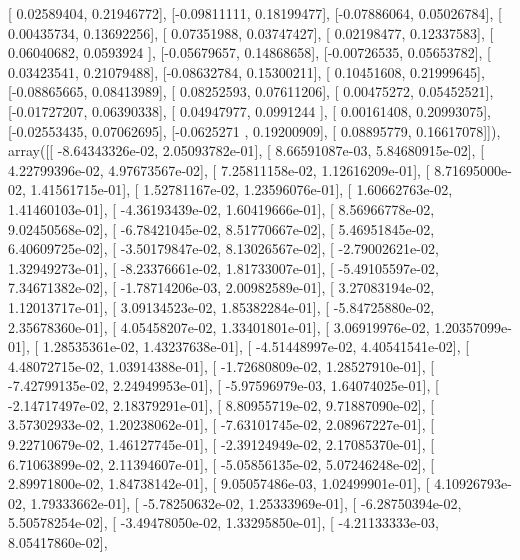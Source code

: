 \documentclass{article}
\begin{document}
       [ 0.02589404,  0.21946772],
       [-0.09811111,  0.18199477],
       [-0.07886064,  0.05026784],
       [ 0.00435734,  0.13692256],
       [ 0.07351988,  0.03747427],
       [ 0.02198477,  0.12337583],
       [ 0.06040682,  0.0593924 ],
       [-0.05679657,  0.14868658],
       [-0.00726535,  0.05653782],
       [ 0.03423541,  0.21079488],
       [-0.08632784,  0.15300211],
       [ 0.10451608,  0.21999645],
       [-0.08865665,  0.08413989],
       [ 0.08252593,  0.07611206],
       [ 0.00475272,  0.05452521],
       [-0.01727207,  0.06390338],
       [ 0.04947977,  0.0991244 ],
       [ 0.00161408,  0.20993075],
       [-0.02553435,  0.07062695],
       [-0.0625271 ,  0.19200909],
       [ 0.08895779,  0.16617078]]), array([[ -8.64343326e-02,   2.05093782e-01],
       [  8.66591087e-03,   5.84680915e-02],
       [  4.22799396e-02,   4.97673567e-02],
       [  7.25811158e-02,   1.12616209e-01],
       [  8.71695000e-02,   1.41561715e-01],
       [  1.52781167e-02,   1.23596076e-01],
       [  1.60662763e-02,   1.41460103e-01],
       [ -4.36193439e-02,   1.60419666e-01],
       [  8.56966778e-02,   9.02450568e-02],
       [ -6.78421045e-02,   8.51770667e-02],
       [  5.46951845e-02,   6.40609725e-02],
       [ -3.50179847e-02,   8.13026567e-02],
       [ -2.79002621e-02,   1.32949273e-01],
       [ -8.23376661e-02,   1.81733007e-01],
       [ -5.49105597e-02,   7.34671382e-02],
       [ -1.78714206e-03,   2.00982589e-01],
       [  3.27083194e-02,   1.12013717e-01],
       [  3.09134523e-02,   1.85382284e-01],
       [ -5.84725880e-02,   2.35678360e-01],
       [  4.05458207e-02,   1.33401801e-01],
       [  3.06919976e-02,   1.20357099e-01],
       [  1.28535361e-02,   1.43237638e-01],
       [ -4.51448997e-02,   4.40541541e-02],
       [  4.48072715e-02,   1.03914388e-01],
       [ -1.72680809e-02,   1.28527910e-01],
       [ -7.42799135e-02,   2.24949953e-01],
       [ -5.97596979e-03,   1.64074025e-01],
       [ -2.14717497e-02,   2.18379291e-01],
       [  8.80955719e-02,   9.71887090e-02],
       [  3.57302933e-02,   1.20238062e-01],
       [ -7.63101745e-02,   2.08967227e-01],
       [  9.22710679e-02,   1.46127745e-01],
       [ -2.39124949e-02,   2.17085370e-01],
       [  6.71063899e-02,   2.11394607e-01],
       [ -5.05856135e-02,   5.07246248e-02],
       [  2.89971800e-02,   1.84738142e-01],
       [  9.05057486e-03,   1.02499901e-01],
       [  4.10926793e-02,   1.79333662e-01],
       [ -5.78250632e-02,   1.25333969e-01],
       [ -6.28750394e-02,   5.50578254e-02],
       [ -3.49478050e-02,   1.33295850e-01],
       [ -4.21133333e-03,   8.05417860e-02],
\end{document}
